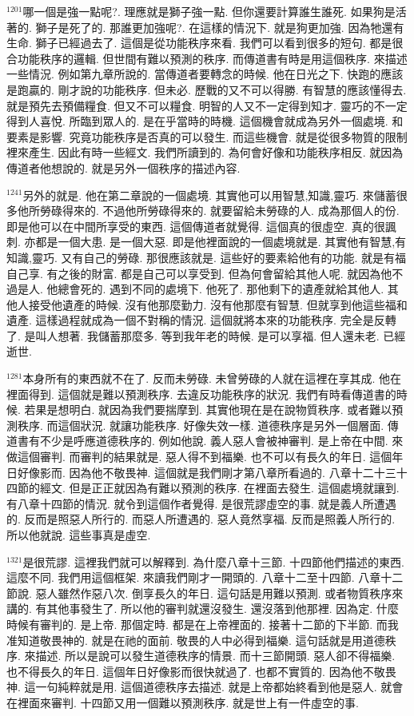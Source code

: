 \documentclass{book}
\begin{document}
$^{1201}$哪一個是強一點呢?.
理應就是獅子強一點.
但你還要計算誰生誰死.
如果狗是活著的.
獅子是死了的.
那誰更加強呢?.
在這樣的情況下.
就是狗更加強.
因為牠還有生命.
獅子已經過去了.
這個是從功能秩序來看.
我們可以看到很多的短句.
都是很合功能秩序的邏輯.
但世間有難以預測的秩序.
而傳道書有時是用這個秩序.
來描述一些情況.
例如第九章所說的.
當傳道者要轉念的時候.
他在日光之下.
快跑的應該是跑贏的.
剛才說的功能秩序.
但未必.
歷戰的又不可以得勝.
有智慧的應該懂得去.
就是預先去預備糧食.
但又不可以糧食.
明智的人又不一定得到知才.
靈巧的不一定得到人喜悅.
所臨到眾人的.
是在乎當時的時機.
這個機會就成為另外一個處境.
和要素是影響.
究竟功能秩序是否真的可以發生.
而這些機會.
就是從很多物質的限制裡來產生.
因此有時一些經文.
我們所讀到的.
為何會好像和功能秩序相反.
就因為傳道者他想說的.
就是另外一個秩序的描述內容.

$^{1241}$另外的就是.
他在第二章說的一個處境.
其實他可以用智慧,知識,靈巧.
來儲蓄很多他所勞碌得來的.
不過他所勞碌得來的.
就要留給未勞碌的人.
成為那個人的份.
即是他可以在中間所享受的東西.
這個傳道者就覺得.
這個真的很虛空.
真的很諷刺.
亦都是一個大患.
是一個大惡.
即是他裡面說的一個處境就是.
其實他有智慧,有知識,靈巧.
又有自己的勞碌.
那很應該就是.
這些好的要素給他有的功能.
就是有福自己享.
有之後的財富.
都是自己可以享受到.
但為何會留給其他人呢.
就因為他不過是人.
他總會死的.
遇到不同的處境下.
他死了.
那他剩下的遺產就給其他人.
其他人接受他遺產的時候.
沒有他那麼勤力.
沒有他那麼有智慧.
但就享到他這些福和遺產.
這樣過程就成為一個不對稱的情況.
這個就將本來的功能秩序.
完全是反轉了.
是叫人想著.
我儲蓄那麼多.
等到我年老的時候.
是可以享福.
但人還未老.
已經逝世.

$^{1281}$本身所有的東西就不在了.
反而未勞碌.
未曾勞碌的人就在這裡在享其成.
他在裡面得到.
這個就是難以預測秩序.
去違反功能秩序的狀況.
我們有時看傳道書的時候.
若果是想明白.
就因為我們要揣摩到.
其實他現在是在說物質秩序.
或者難以預測秩序.
而這個狀況.
就讓功能秩序.
好像失效一樣.
道德秩序是另外一個層面.
傳道書有不少是呼應道德秩序的.
例如他說.
義人惡人會被神審判.
是上帝在中間.
來做這個審判.
而審判的結果就是.
惡人得不到福樂.
也不可以有長久的年日.
這個年日好像影而.
因為他不敬畏神.
這個就是我們剛才第八章所看過的.
八章十二十三十四節的經文.
但是正正就因為有難以預測的秩序.
在裡面去發生.
這個處境就讓到.
有八章十四節的情況.
就令到這個作者覺得.
是很荒謬虛空的事.
就是義人所遭遇的.
反而是照惡人所行的.
而惡人所遭遇的.
惡人竟然享福.
反而是照義人所行的.
所以他就說.
這些事真是虛空.

$^{1321}$是很荒謬.
這裡我們就可以解釋到.
為什麼八章十三節.
十四節他們描述的東西.
這麼不同.
我們用這個框架.
來讀我們剛才一開頭的.
八章十二至十四節.
八章十二節說.
惡人雖然作惡八次.
倒享長久的年日.
這句話是用難以預測.
或者物質秩序來講的.
有其他事發生了.
所以他的審判就還沒發生.
還沒落到他那裡.
因為定.
什麼時候有審判的.
是上帝.
那個定時.
都是在上帝裡面的.
接著十二節的下半節.
而我准知道敬畏神的.
就是在祂的面前.
敬畏的人中必得到福樂.
這句話就是用道德秩序.
來描述.
所以是說可以發生道德秩序的情景.
而十三節開頭.
惡人卻不得福樂.
也不得長久的年日.
這個年日好像影而很快就過了.
也都不實質的.
因為他不敬畏神.
這一句純粹就是用.
這個道德秩序去描述.
就是上帝都始終看到他是惡人.
就會在裡面來審判.
十四節又用一個難以預測秩序.
就是世上有一件虛空的事.
\end{document}
